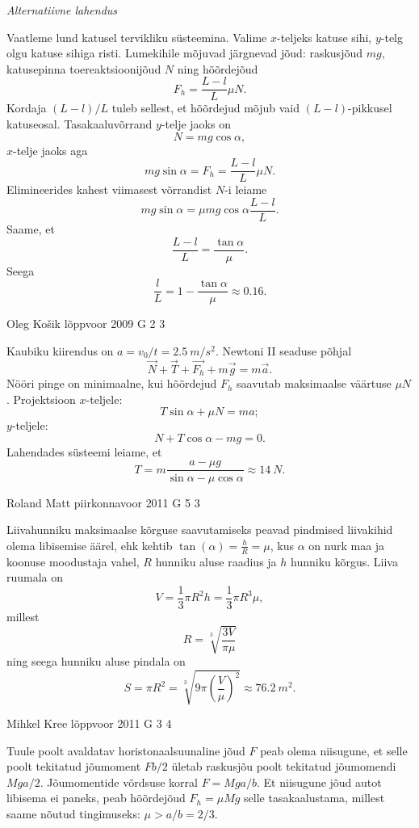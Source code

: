 \documentclass[11pt]{article}
\begin{document}
{{\vspace{0.5\baselineskip}

\emph{Alternatiivne lahendus}

Vaatleme lund katusel tervikliku süsteemina. Valime $x$-teljeks katuse sihi, $y$-telg olgu katuse sihiga risti. Lumekihile mõjuvad järgnevad jõud: raskusjõud $mg$, katusepinna toereaktsioonijõud $N$ ning hõõrdejõud
\[
F_h = \frac{L-l}{L} \mu N.
\]
Kordaja $(L-l)/L$ tuleb sellest, et hõõrdejud mõjub vaid $(L-l)$-pikkusel katuseosal.
Tasakaaluvõrrand $y$-telje jaoks on
\[
N = mg \cos \alpha,
\]
$x$-telje jaoks aga
\[
m g \sin \alpha=F_{h}=\frac{L-l}{L} \mu N.
\]
Elimineerides kahest viimasest võrrandist $N$-i leiame
\[
m g \sin \alpha=\mu m g \cos \alpha \frac{L-l}{L}.
\]
Saame, et
\[
\frac{L-l}{L} = \frac{\tan\alpha}{\mu}.
\]
Seega
\[
\frac{l}{L}=1-\frac{\tan \alpha}{\mu} \approx \num{0,16}.
\]
\fi
}

{Oleg Košik} %
{lõppvoor} %
{2009} %
{G 2} %
{3} %
{

\ifSolution
Kaubiku kiirendus on $a=v_0/t=\SI{2.5}{m/s^2}$. Newtoni II seaduse põhjal
\[
\vec{N}+\vec{T}+\vec{F_h}+m\vec{g}=m\vec{a}.
\]
Nööri pinge on minimaalne, kui hõõrdejud $F_h$ saavutab maksimaalse väärtuse $\mu N$. Projektsioon $x$-teljele:
\[
T\sin\alpha+\mu N=ma;
\]
$y$-teljele:
\[
N+T\cos\alpha-mg=0.
\]
Lahendades süsteemi leiame, et
\[
T=m\frac{a-\mu g}{\sin\alpha-\mu\cos\alpha} \approx \SI{14}{N}.
\]
\fi
}

{Roland Matt} %
{piirkonnavoor} %
{2011} %
{G 5} %
{3} %
{

\ifSolution
Liivahunniku maksimaalse kõrguse saavutamiseks peavad pindmised liivakihid olema libisemise äärel, ehk kehtib $\tan (\alpha)=\frac{h}{R}=\mu$, kus $\alpha$ on nurk maa ja koonuse moodustaja vahel, $R$ hunniku aluse raadius ja $h$ hunniku kõrgus. Liiva ruumala on
\[
V=\frac{1}{3} \pi R^{2} h=\frac{1}{3} \pi R^{3} \mu,
\]
millest 
\[
R=\sqrt[3]{\frac{3 V}{\pi \mu}}
\]
ning seega hunniku aluse pindala on
\[
S=\pi R^{2}=\sqrt[3]{9 \pi\left(\frac{V}{\mu}\right)^{2}} \approx \SI{76.2}{m^2}.
\]
\fi
}

{Mihkel Kree} %
{lõppvoor} %
{2011} %
{G 3} %
{4} %
{

\ifSolution
Tuule poolt avaldatav horistonaalsuunaline jõud $F$ peab olema niisugune, et selle poolt tekitatud jõumoment $Fb/2$ ületab raskusjõu poolt tekitatud jõumomendi $Mga/2$. Jõumomentide võrdsuse korral $F=Mga/b$. Et niisugune jõud autot libisema ei paneks, peab hõõrdejõud $F_h=\mu Mg$ selle tasakaalustama, millest saame nõutud tingimuseks: $\mu > a/b = 2/3$.
\fi
}

}
\end{document}
